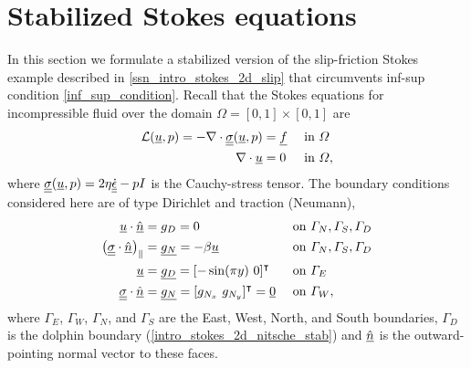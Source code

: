 \section{Stabilized Stokes equations} \label{ssn_intro_stokes_2d_slip_stab}

In this section we formulate a stabilized version of the slip-friction Stokes example described in \cref{ssn_intro_stokes_2d_slip} that circumvents inf-sup condition \cref{inf_sup_condition}.  Recall that the Stokes equations for incompressible fluid over the domain $\Omega = [0,1] \times [0,1]$ are
\begin{align}
  \label{intro_stokes_stab_momentum}
  \mathcal{L} (\underline{u}, p) = -\nabla \cdot \underline{\underline{\sigma}}(\underline{u}, p) &= \underline{f} &&\text{ in } \varOmega \\
  \label{intro_stokes_stab_mass}
  \nabla \cdot \underline{u} &= 0 &&\text{ in } \varOmega,
\end{align}
where $\underline{\underline{\sigma}}(\underline{u}, p) = 2\eta\underline{\underline{\dot{\epsilon}}} - pI$ is the Cauchy-stress tensor.  The boundary conditions considered here are of type Dirichlet and traction (Neumann),
\begin{align}
  \label{intro_stokes_stab_gD_N_S_D_slip}
  \rankone{u} \cdot \normal &= g_D = 0 &&\text{ on } \Gamma_N, \Gamma_S, \Gamma_D \\
  \label{intro_stokes_stab_gN_N_S_D_fric}
  \left( \ranktwo{\sigma} \cdot \normal \right)_{\Vert} &= \rankone{g_N} = -\beta \rankone{u} &&\text{ on } \Gamma_N, \Gamma_S, \Gamma_D \\
  \label{intro_stokes_stab_gD_E}
  \rankone{u} &= \rankone{g_D} = [-\sin(\pi y)\ 0]\T &&\text{ on } \Gamma_E \\
  \label{intro_stokes_stab_gN}
  \ranktwo{\sigma} \cdot \normal &= \rankone{g_N} = [g_{N_x}\ g_{N_y}]\T = \rankone{0} &&\text{ on } \Gamma_W,
\end{align}
where $\Gamma_E$, $\Gamma_W$, $\Gamma_N$, and $\Gamma_S$ are the East, West, North, and South boundaries, $\Gamma_D$ is the dolphin boundary (\cref{intro_stokes_2d_nitsche_stab}) and $\underline{\hat{n}}$ is the outward-pointing normal vector to these faces.

